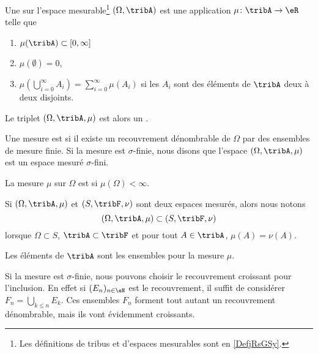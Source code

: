 \begin{definition}  \label{DefBTsgznn}
	Une  sur l'espace mesurable\footnote{Les définitions de tribus et d'espaces mesurables sont en \ref{DefjRsGSy}.} \( (\Omega,\tribA)\) est une application \( \mu\colon \tribA\to \eR\) telle que
	\begin{enumerate}
        \item
            \( \mu(\tribA)\subset \mathopen[ 0 , \infty \mathclose]\)
		\item
		      \( \mu(\emptyset)=0\),
		\item       \label{ItemQFjtOjXiii}
		      \( \mu\left( \bigcup_{i=0}^{\infty}A_i\right)=\sum_{i=0}^{\infty}\mu(A_i)\) si les \( A_i\) sont des éléments de \( \tribA\) deux à deux disjoints.
	\end{enumerate}
	Le triplet \( (\Omega,\tribA,\mu)\) est alors un .

	Une mesure est  si il existe un recouvrement dénombrable de \( \Omega\) par des ensembles de mesure finie. Si la mesure est \( \sigma\)-finie, nous disons que l'espace \( (\Omega,\tribA,\mu)\) est un espace mesuré \( \sigma\)-fini.

	La mesure \( \mu\) sur \( \Omega\) est  si \( \mu(\Omega)<\infty\).
\end{definition}

Si \( (\Omega,\tribA,\mu)\) et \( (S,\tribF,\nu)\) sont deux espaces mesurés, alors nous notons
\begin{equation}
	(\Omega,\tribA,\mu)\subset (S,\tribF,\nu)
\end{equation}
lorsque \( \Omega\subset S\), \( \tribA\subset\tribF\) et pour tout \( A\in\tribA\), \( \mu(A)=\nu(A)\).

\begin{definition}\label{DefHGsQxHB}
	Les éléments de \( \tribA\) sont les ensembles  pour la mesure \( \mu\).
\end{definition}

Si la mesure est \( \sigma\)-finie, nous pouvons choisir le recouvrement croissant pour l'inclusion. En effet si \( (E_n)_{n\in \eN}\) est le recouvrement, il suffit de considérer \( F_n=\bigcup_{k\leq n}E_k\). Ces ensembles \( F_n\) forment tout autant un recouvrement dénombrable, mais ils vont évidemment croissants.

